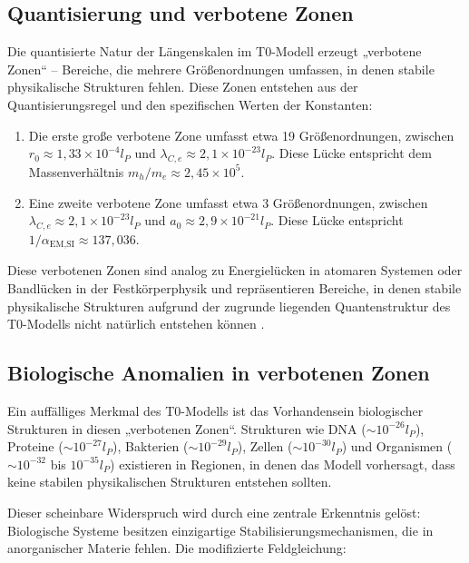 \documentclass[twocolumn,aps,prl]{revtex4-2}
\begin{document}
	\subsection{Quantisierung und verbotene Zonen}
	\label{subsec:quantization}
	
	Die quantisierte Natur der Längenskalen im T0-Modell erzeugt „verbotene Zonen“ – Bereiche, die mehrere Größenordnungen umfassen, in denen stabile physikalische Strukturen fehlen. Diese Zonen entstehen aus der Quantisierungsregel und den spezifischen Werten der Konstanten:
	
	\begin{enumerate}
		\item Die erste große verbotene Zone umfasst etwa 19 Größenordnungen, zwischen $r_0 \approx 1,33 \times 10^{-4} l_P$ und $\lambda_{C,e} \approx 2,1 \times 10^{-23} l_P$. Diese Lücke entspricht dem Massenverhältnis $m_h/m_e \approx 2,45 \times 10^5$.
		\item Eine zweite verbotene Zone umfasst etwa 3 Größenordnungen, zwischen $\lambda_{C,e} \approx 2,1 \times 10^{-23} l_P$ und $a_0 \approx 2,9 \times 10^{-21} l_P$. Diese Lücke entspricht $1/\alpha_{\text{EM,SI}} \approx 137,036$.
	\end{enumerate}
	
	Diese verbotenen Zonen sind analog zu Energielücken in atomaren Systemen oder Bandlücken in der Festkörperphysik und repräsentieren Bereiche, in denen stabile physikalische Strukturen aufgrund der zugrunde liegenden Quantenstruktur des T0-Modells nicht natürlich entstehen können \cite{pascher_higgs_2025}.
	
	\subsection{Biologische Anomalien in verbotenen Zonen}
	\label{subsec:bio_anomalies}
	
	Ein auffälliges Merkmal des T0-Modells ist das Vorhandensein biologischer Strukturen in diesen „verbotenen Zonen“. Strukturen wie DNA ($\sim 10^{-26} l_P$), Proteine ($\sim 10^{-27} l_P$), Bakterien ($\sim 10^{-29} l_P$), Zellen ($\sim 10^{-30} l_P$) und Organismen ($\sim 10^{-32}$ bis $10^{-35} l_P$) existieren in Regionen, in denen das Modell vorhersagt, dass keine stabilen physikalischen Strukturen entstehen sollten.
	
	Dieser scheinbare Widerspruch wird durch eine zentrale Erkenntnis gelöst: Biologische Systeme besitzen einzigartige Stabilisierungsmechanismen, die in anorganischer Materie fehlen. Die modifizierte Feldgleichung:
	
\end{document}
